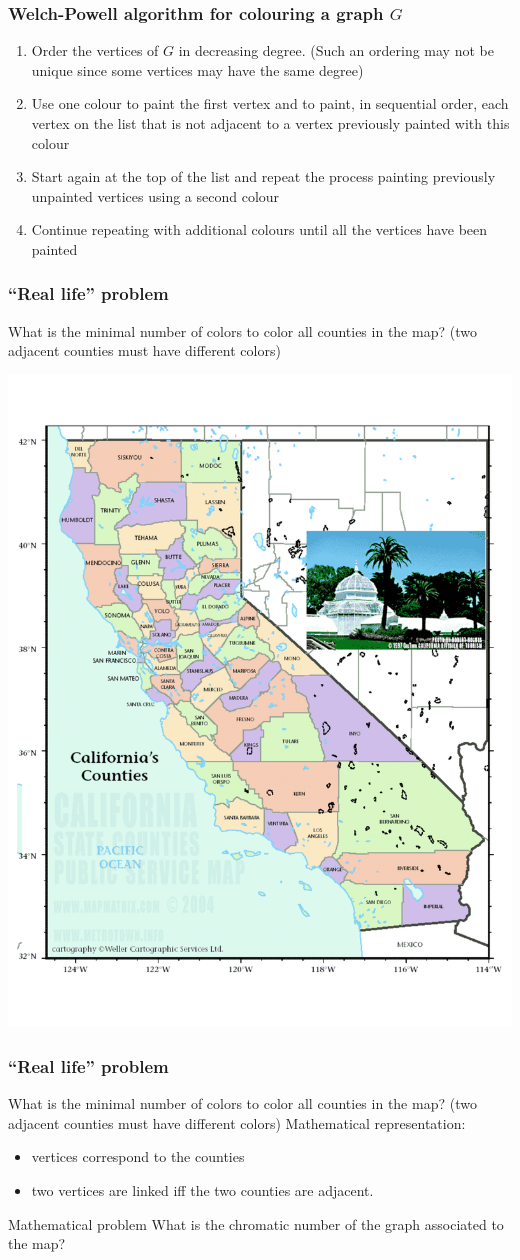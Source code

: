 \documentclass[aspectratio=43]{beamer}
\begin{document}
\begin{frame}\frametitle{Welch-Powell algorithm for colouring a graph $G$}
\begin{enumerate}
\item Order the vertices of $G$ in decreasing degree. (Such an ordering may not be unique since some vertices may have the same degree)
\vfill
\item Use one colour to paint the first vertex and to paint, in sequential order, each vertex on the list that is not adjacent to a vertex previously painted with this colour
\vfill
\item Start again at the top of the list and repeat the process painting previously unpainted vertices using a second colour
\vfill
\item Continue repeating with additional colours until all the vertices have been painted
\end{enumerate}\end{frame}

\begin{frame}\frametitle{``Real life'' problem}
What is the minimal number of colors to color all counties in the map?
(two adjacent counties must have different colors)
\begin{center}
\includegraphics[width=.55\textwidth]{FIGS_slides/california}
\end{center}\end{frame}

\begin{frame}\frametitle{``Real life'' problem}
What is the minimal number of colors to color all counties in the map?
(two adjacent counties must have different colors)
\vfill
Mathematical representation:
\begin{itemize}
\item vertices correspond to the counties
\item two vertices are linked iff the two counties are adjacent.
\end{itemize}
\vfill
\begin{block}{Mathematical problem}
What is the chromatic number of the graph associated to the map?
\end{block}
\end{frame}
\end{document}
